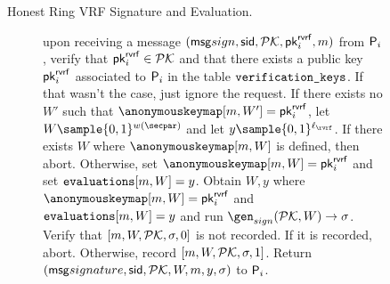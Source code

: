 \begin{figure}
\begin{tcolorbox}
{\begin{description}
				
				
				\item[Honest Ring VRF Signature and Evaluation.] upon receiving a message $(\mathsf{msg}{sign}, \textsf{sid}, {\mathcal{PK}}, \mathsf{pk}^{\mathsf{rvrf}}_i, m)$ from $\mathsf{P}_i$, verify that $\mathsf{pk}^{\mathsf{rvrf}}_i \in {\ensuremath{\mathcal{PK}}}$ and that there exists a public key $\mathsf{pk}^{\mathsf{rvrf}}_i$ associated to $\mathsf{P}_i$ in the table $ \texttt{verification\_keys} $. If that wasn't the case, just ignore the request. 	
				If there exists no $ W' $ such that $ \anonymouskeymap[m,W'] =  \pkrvrf_i $, let $ W \sample \{0,1\}^{w(\secpar)}$ and let $y \sample \bin^{\ell_\rvrf}$. If there exists $ W $ where $ \anonymouskeymap[m,W] $ is defined, then abort. Otherwise, set $ \anonymouskeymap[m,W] = \pkrvrf_i $ and set $ \texttt{evaluations}[m, W] = y$.
				Obtain $ W, y $ where $ \anonymouskeymap[m,W] =\pkrvrf_i $ and $ \texttt{evaluations}[m, W] = y$  and run  $ \gen_{sign}(\pkring, W) \rightarrow \sigma $. Verify that $ [m, W,{\mathcal{PK}}, \sigma, 0] $ is not recorded. If it is recorded, abort. Otherwise, record $ [m, W, {\mathcal{PK}},\sigma, 1] $. Return $(\mathsf{msg}{signature}, \textsf{sid}, {\mathcal{PK}},W,m, y, \sigma)$ to $\mathsf{P}_i$.
			
			

\end{description}}
\end{tcolorbox}
\end{figure}

